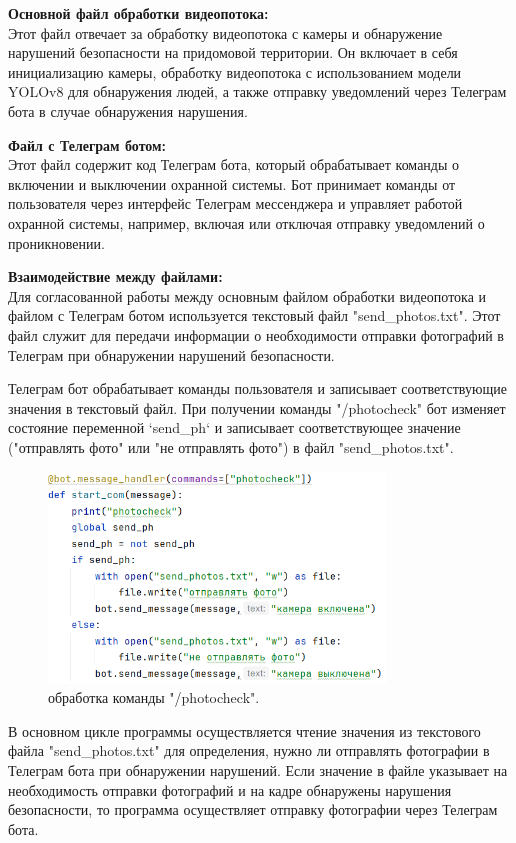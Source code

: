 \textbf{Основной файл обработки видеопотока:}
\\
Этот файл отвечает за обработку видеопотока с камеры и обнаружение нарушений безопасности на придомовой территории. Он включает в себя инициализацию камеры, обработку видеопотока с использованием модели YOLOv8 для обнаружения людей, а также отправку уведомлений через Телеграм бота в случае обнаружения нарушения.

\textbf{Файл с Телеграм ботом:}
\\
Этот файл содержит код Телеграм бота, который обрабатывает команды о включении и выключении охранной системы. Бот принимает команды от пользователя через интерфейс Телеграм мессенджера и управляет работой охранной системы, например, включая или отключая отправку уведомлений о проникновении.

\textbf{Взаимодействие между файлами:}
\\
Для согласованной работы между основным файлом обработки видеопотока и файлом с Телеграм ботом используется текстовый файл "send\_photos.txt". Этот файл служит для передачи информации о необходимости отправки фотографий в Телеграм при обнаружении нарушений безопасности.

Телеграм бот обрабатывает команды пользователя и записывает соответствующие значения в текстовый файл. При получении команды "/photocheck" бот изменяет состояние переменной `send\_ph` и записывает соответствующее значение ("отправлять фото" или "не отправлять фото") в файл "send\_photos.txt".

\begin{figure}[h!]
	\centering
	\includegraphics[width=0.8\textwidth]{./graphics/img/image15.png}
	\caption{обработка команды "/photocheck".}
	\label{fig:img15}
\end{figure}

В основном цикле программы осуществляется чтение значения из текстового файла "send\_photos.txt" для определения, нужно ли отправлять фотографии в Телеграм бота при обнаружении нарушений. Если значение в файле указывает на необходимость отправки фотографий и на кадре обнаружены нарушения безопасности, то программа осуществляет отправку фотографии через Телеграм бота.

